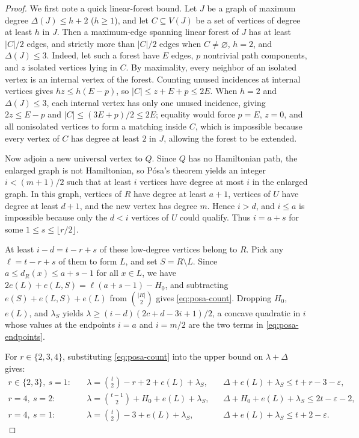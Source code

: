 \documentclass[10pt]{article}
\theoremstyle{compactplain}
\theoremstyle{remark}\newtheorem{remark}[theorem]{Remark}
\begin{document}
\begin{proof}
We first note a quick linear-forest bound. Let $J$ be a graph of maximum
degree $\Delta(J)\le h+2$ ($h\ge1$), and let $C\subseteq V(J)$ be a set
of vertices of degree at least $h$ in $J$. Then a maximum-edge spanning
linear forest of $J$ has at least $|C|/2$ edges, and strictly more than
$|C|/2$ edges when $C\ne\varnothing$, $h=2$, and $\Delta(J)\le3$.
Indeed, let such a forest have $E$ edges, $p$ nontrivial path
components, and $z$ isolated vertices lying in $C$. By maximality, every
neighbor of an isolated vertex is an internal vertex of the forest.
Counting unused incidences at internal vertices gives $hz\le h(E-p)$, so
$|C|\le z+E+p\le2E$. When $h=2$ and $\Delta(J)\le3$, each internal
vertex has only one unused incidence, giving $2z\le E-p$ and
$|C|\le(3E+p)/2\le2E$; equality would force $p=E$, $z=0$, and all
nonisolated vertices to form a matching inside $C$, which is impossible
because every vertex of $C$ has degree at least $2$ in $J$, allowing the
forest to be extended.

Now adjoin a new universal vertex to $Q$. Since $Q$ has no Hamiltonian
path, the enlarged graph is not Hamiltonian, so P\'osa's theorem yields
an integer $i<(m+1)/2$ such that at least $i$ vertices have degree at
most $i$ in the enlarged graph. In this graph, vertices of $R$ have
degree at least $a+1$, vertices of $U$ have degree at least $d+1$, and
the new vertex has degree $m$. Hence $i>d$, and $i\le a$ is impossible
because only the $d<i$ vertices of $U$ could qualify. Thus $i=a+s$ for
some $1\le s\le\lfloor r/2\rfloor$.

At least $i-d=t-r+s$ of these low-degree vertices belong to $R$. Pick
any $\ell=t-r+s$ of them to form $L$, and set $S=R\setminus L$. Since
$a\le d_R(x)\le a+s-1$ for all $x\in L$, we have
$2e(L)+e(L,S)=\ell(a+s-1)-H_0$, and subtracting $e(S)+e(L,S)+e(L)$ from
$\binom{|R|}{2}$ gives \eqref{eq:posa-count}. Dropping $H_0$, $e(L)$,
and $\lambda_S$ yields $\lambda\ge(i-d)(2c+d-3i+1)/2$, a concave
quadratic in $i$ whose values at the endpoints $i=a$ and $i=m/2$ are the
two terms in \eqref{eq:posa-endpoints}.

For $r\in\{2,3,4\}$, substituting \eqref{eq:posa-count} into the upper
bound on $\lambda+\Delta$ gives:
\begin{align}
 r\in\{2,3\},\ s=1:\quad
 &\lambda=\binom{t}{2}-r+2+e(L)+\lambda_S,
 && \Delta+e(L)+\lambda_S\le t+r-3-\varepsilon, \label{eq:budget23}\\
 r=4,\ s=2:\quad
 &\lambda=\binom{t-1}{2}+H_0+e(L)+\lambda_S,
 && \Delta+H_0+e(L)+\lambda_S\le2t-\varepsilon-2, \label{eq:budget42}\\
 r=4,\ s=1:\quad
 &\lambda=\binom{t}{2}-3+e(L)+\lambda_S,
 && \Delta+e(L)+\lambda_S\le t+2-\varepsilon. \label{eq:budget41}
\end{align}


\end{proof}
\end{document}
